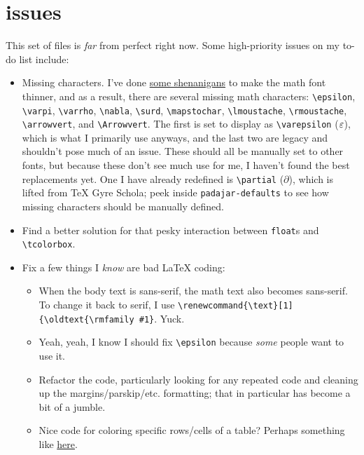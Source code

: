 \documentclass[11pt]{padajar-memo}
\newcommand{\ttslash}[1]{\texttt{\textbackslash #1}}
\begin{document}
\section{issues}

This set of files is \textit{far} from perfect right now. Some high-priority issues on my to-do list include:

\begin{itemize}
	\item Missing characters. I've done \href{https://tex.stackexchange.com/questions/739639/making-ibm-plex-math-thinner/}{some shenanigans} to make the math font thinner, and as a result, there are several missing math characters: \ttslash{epsilon}, \ttslash{varpi}, \ttslash{varrho}, \ttslash{nabla}, \ttslash{surd}, \ttslash{mapstochar}, \ttslash{lmoustache}, \ttslash{rmoustache}, \ttslash{arrowvert}, and \ttslash{Arrowvert}. The first is set to display as \ttslash{varepsilon} ($\varepsilon$), which is what I primarily use anyways, and the last two are legacy and shouldn't pose much of an issue. These should all be manually set to other fonts, but because these don't see much use for me, I haven't found the best replacements yet. One I have already redefined is \ttslash{partial} ($\partial$), which is lifted from \TeX{} Gyre Schola; peek inside \texttt{padajar-defaults} to see how missing characters should be manually defined.
	\item Find a better solution for that pesky interaction between \texttt{float}s and \ttslash{tcolorbox}.
	\item Fix a few things I \textit{know} are bad \LaTeX{} coding:
	\begin{itemize}
		\item When the body text is sans-serif, the math text also becomes sans-serif. To change it back to serif, I use \ttslash{renewcommand\{\textbackslash text\}[1]\{\textbackslash oldtext\{\textbackslash rmfamily \#1\}}. Yuck.
		\item Yeah, yeah, I know I should fix \ttslash{epsilon} because \emph{some} people want to use it.
		\item Refactor the code, particularly looking for any repeated code and cleaning up the margins/parskip/etc. formatting; that in particular has become a bit of a jumble.
		\item Nice code for coloring specific rows/cells of a table? Perhaps something like \href{https://tex.stackexchange.com/questions/213301/efficiently-colouring-block-of-table-cells}{here}.
	\end{itemize}
\end{itemize}
\end{document}
